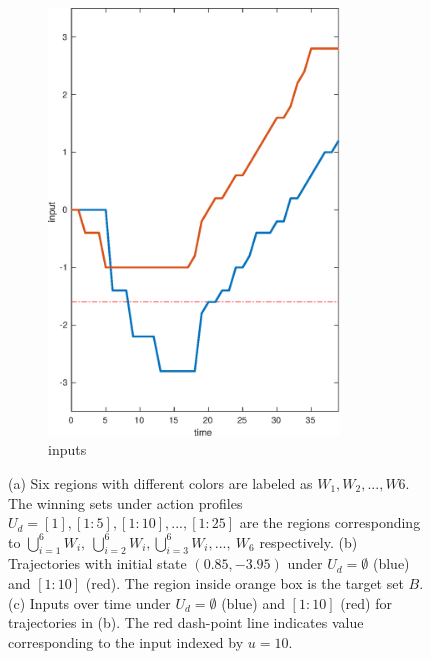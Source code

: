 \begin{figure}
\begin{subfigure}[b]{0.25\textwidth}
		\includegraphics[width=0.85\textwidth]{pic/input}
		\caption{inputs}
		\label{fig:input}
	\end{subfigure}
	\caption{(a) Six regions with different colors are labeled as $ W_1,W_2,...,W6 $. The winning sets under action profiles $U_d = [1], [1:5],[1:10],...,[1:25]$ are the regions corresponding to $ \bigcup_{i=1}^6 W_i,\ \bigcup_{i=2}^6 W_i,\bigcup_{i=3}^6 W_i,...,\ W_6 $ respectively. (b) Trajectories with initial state $ (0.85,-3.95) $ under $ U_d = \emptyset $ (blue) and $[1:10] $ (red). The region inside orange box is the target set $ B $. (c) Inputs over time under $ U_d = \emptyset $ (blue) and $ [1:10] $ (red) for trajectories in (b). The red dash-point line indicates value corresponding to the input indexed by $ u = 10 $.} %
\end{figure}

